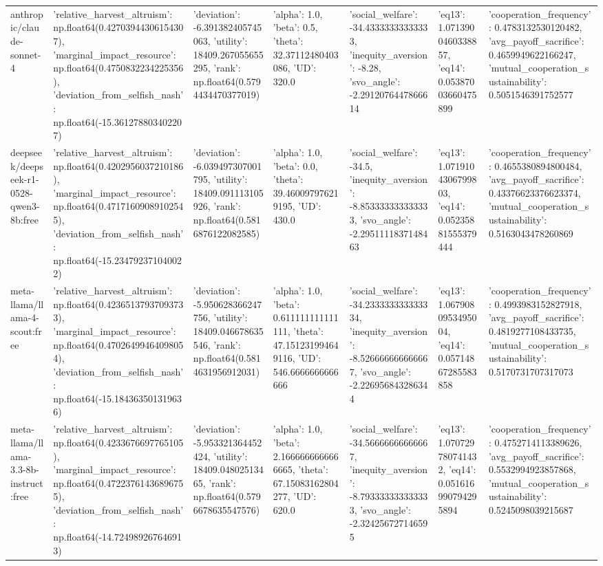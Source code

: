 \begin{table}
\begin{tabular}{lllllll}
anthropic/claude-sonnet-4 & {'relative_harvest_altruism': np.float64(0.42703944306154307), 'marginal_impact_resource': np.float64(0.4750832234225356), 'deviation_from_selfish_nash': np.float64(-15.361278803402207)} & {'deviation': -6.391382405745063, 'utility': 18409.267055655295, 'rank': np.float64(0.5794434470377019)} & {'alpha': 1.0, 'beta': 0.5, 'theta': 32.37112480403086, 'UD': 320.0} & {'social_welfare': -34.43333333333333, 'inequity_aversion': -8.28, 'svo_angle': -2.2912076447866614} & {'eq13': 1.0713900460338857, 'eq14': 0.05387003660475899} & {'cooperation_frequency': 0.4783132530120482, 'avg_payoff_sacrifice': 0.4659949622166247, 'mutual_cooperation_sustainability': 0.5051546391752577} \\
deepseek/deepseek-r1-0528-qwen3-8b:free & {'relative_harvest_altruism': np.float64(0.4202956037210186), 'marginal_impact_resource': np.float64(0.47171609089102545), 'deviation_from_selfish_nash': np.float64(-15.234792371040022)} & {'deviation': -6.039497307001795, 'utility': 18409.091113105926, 'rank': np.float64(0.5816876122082585)} & {'alpha': 1.0, 'beta': 0.0, 'theta': 39.460097976219195, 'UD': 430.0} & {'social_welfare': -34.5, 'inequity_aversion': -8.853333333333333, 'svo_angle': -2.2951111837148463} & {'eq13': 1.0719104306799803, 'eq14': 0.05235881555379444} & {'cooperation_frequency': 0.4655380894800484, 'avg_payoff_sacrifice': 0.43376623376623374, 'mutual_cooperation_sustainability': 0.5163043478260869} \\
meta-llama/llama-4-scout:free & {'relative_harvest_altruism': np.float64(0.42365137937093733), 'marginal_impact_resource': np.float64(0.47026499464098054), 'deviation_from_selfish_nash': np.float64(-15.184363501319636)} & {'deviation': -5.950628366247756, 'utility': 18409.046678635546, 'rank': np.float64(0.5814631956912031)} & {'alpha': 1.0, 'beta': 0.611111111111111, 'theta': 47.151231994649116, 'UD': 546.6666666666666} & {'social_welfare': -34.233333333333334, 'inequity_aversion': -8.526666666666667, 'svo_angle': -2.226956843286344} & {'eq13': 1.0679080953495004, 'eq14': 0.05714867285583858} & {'cooperation_frequency': 0.4993983152827918, 'avg_payoff_sacrifice': 0.4819277108433735, 'mutual_cooperation_sustainability': 0.5170731707317073} \\
meta-llama/llama-3.3-8b-instruct:free & {'relative_harvest_altruism': np.float64(0.4233676697765105), 'marginal_impact_resource': np.float64(0.47223761436896755), 'deviation_from_selfish_nash': np.float64(-14.724989267646913)} & {'deviation': -5.953321364452424, 'utility': 18409.04802513465, 'rank': np.float64(0.5796678635547576)} & {'alpha': 1.0, 'beta': 2.1666666666666665, 'theta': 67.15083162804277, 'UD': 620.0} & {'social_welfare': -34.56666666666667, 'inequity_aversion': -8.793333333333333, 'svo_angle': -2.324256727146595} & {'eq13': 1.070729780741432, 'eq14': 0.051616990794295894} & {'cooperation_frequency': 0.4752714113389626, 'avg_payoff_sacrifice': 0.5532994923857868, 'mutual_cooperation_sustainability': 0.5245098039215687} \\

\end{tabular}
\end{table}
